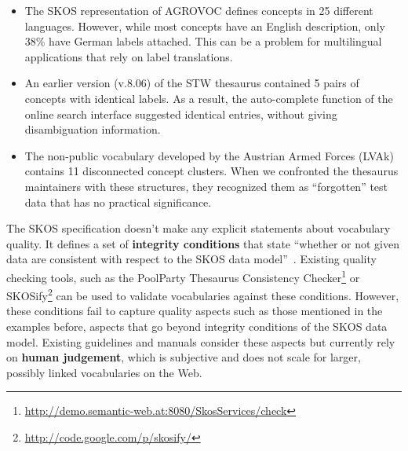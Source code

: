 \begin{itemize}

	\item The SKOS representation of AGROVOC defines concepts in 25 different languages. However, while most concepts have an English description, only 38\% have German labels attached. This can be a problem for multilingual applications that rely on label translations.

	\item An earlier version (v.8.06) of the STW thesaurus contained 5 pairs of concepts with identical labels. As a result, the auto-complete function of the online search interface suggested identical entries, without giving disambiguation information.


	\item The non-public vocabulary developed by the Austrian Armed Forces (LVAk) contains 11 disconnected concept clusters. When we confronted the thesaurus maintainers with these structures, they recognized them as ``forgotten'' test data that has no practical significance.
	

\end{itemize}


The SKOS specification doesn't make any explicit statements about vocabulary quality. It defines a set of \textbf{integrity conditions} that state ``whether or not given data are consistent with respect to the SKOS data model''~\cite{Miles2005}. Existing quality checking tools, such as the PoolParty Thesaurus Consistency Checker\footnote{\url{http://demo.semantic-web.at:8080/SkosServices/check}} or SKOSify\footnote{\url{http://code.google.com/p/skosify/}} can be used to validate vocabularies against these conditions. However, these conditions fail to capture quality aspects such as those mentioned in the examples before, aspects that go beyond integrity conditions of the SKOS data model. Existing guidelines and manuals consider these aspects but currently rely on \textbf{human judgement}, which is subjective and does not scale for larger, possibly linked vocabularies on the Web.

